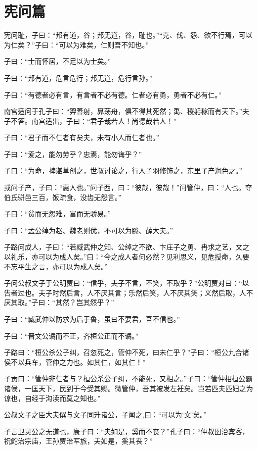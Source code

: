 \documentclass[12pt,a4paper]{ctexbook}
\begin{document}
\section{宪问篇}
宪问耻，子曰：“邦有道，谷；邦无道，谷，耻也。”“克、伐、怨、欲不行焉，可以为仁矣？”子曰：“可以为难矣，仁则吾不知也。”\par
子曰：“士而怀居，不足以为士矣。”\par
子曰：“邦有道，危言危行；邦无道，危行言孙。”\par
子曰：“有德者必有言，有言者不必有德。仁者必有勇，勇者不必有仁。”\par
南宫适问于孔子曰：“羿善射，奡荡舟，俱不得其死然；禹、稷躬稼而有天下。”夫子不答。南宫适出，子曰：“君子哉若人！尚德哉若人！”\par
子曰：“君子而不仁者有矣夫，未有小人而仁者也。”\par
子曰：“爱之，能勿劳乎？忠焉，能勿诲乎？”\par
子曰：“为命，裨谌草创之，世叔讨论之，行人子羽修饰之，东里子产润色之。”\par
或问子产，子曰：“惠人也。”问子西，曰：“彼哉，彼哉！”问管仲，曰：“人也。夺伯氏骈邑三百，饭疏食，没齿无怨言。”\par
子曰：“贫而无怨难，富而无骄易。”\par
子曰：“孟公绰为赵、魏老则优，不可以为滕、薛大夫。”\par
子路问成人，子曰：“若臧武仲之知、公绰之不欲、卞庄子之勇、冉求之艺，文之以礼乐，亦可以为成人矣。”曰：“今之成人者何必然？见利思义，见危授命，久要不忘平生之言，亦可以为成人矣。”\par
子问公叔文子于公明贾曰：“信乎，夫子不言，不笑，不取乎？”公明贾对曰：“以告者过也。夫子时然后言，人不厌其言；乐然后笑，人不厌其笑；义然后取，人不厌其取。”子曰：“其然？岂其然乎？”\par
子曰：“臧武仲以防求为后于鲁，虽曰不要君，吾不信也。”\par
子曰：“晋文公谲而不正，齐桓公正而不谲。”\par
子路曰：“桓公杀公子纠，召忽死之，管仲不死，曰未仁乎？”子曰：“桓公九合诸侯不以兵车，管仲之力也。如其仁，如其仁！”\par
子贡曰：“管仲非仁者与？桓公杀公子纠，不能死，又相之。”子曰：“管仲相桓公霸诸侯，一匡天下，民到于今受其赐。微管仲，吾其被发左衽矣。岂若匹夫匹妇之为谅也，自经于沟渎而莫之知也。”\par
公叔文子之臣大夫僎与文子同升诸公，子闻之,曰：“可以为‘文’矣。”\par
子言卫灵公之无道也，康子曰：“夫如是，奚而不丧？”孔子曰：“仲叔圉治宾客，祝鮀治宗庙，王孙贾治军旅，夫如是，奚其丧？”\par
\end{document}
